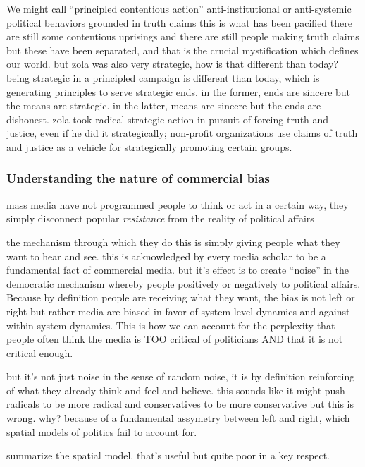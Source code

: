 \documentclass[12pt,book]{article}
\begin{document}
We might call ``principled contentious action'' anti-institutional or
anti-systemic political behaviors grounded in truth claims this is what
has been pacified there are still some contentious uprisings and there
are still people making truth claims but these have been separated, and
that is the crucial mystification which defines our world. but zola was
also very strategic, how is that different than today? being strategic
in a principled campaign is different than today, which is generating
principles to serve strategic ends. in the former, ends are sincere but
the means are strategic. in the latter, means are sincere but the ends
are dishonest. zola took radical strategic action in pursuit of forcing
truth and justice, even if he did it strategically; non-profit
organizations use claims of truth and justice as a vehicle for
strategically promoting certain groups.

\subsubsection{Understanding the nature of commercial
bias}\label{understanding-the-nature-of-commercial-bias}

mass media have not programmed people to think or act in a certain way,
they simply disconnect popular \emph{resistance} from the reality of
political affairs

the mechanism through which they do this is simply giving people what
they want to hear and see. this is acknowledged by every media scholar
to be a fundamental fact of commercial media. but it's effect is to
create ``noise'' in the democratic mechanism whereby people positively
or negatively to political affairs. Because by definition people are
receiving what they want, the bias is not left or right but rather media
are biased in favor of system-level dynamics and against within-system
dynamics. This is how we can account for the perplexity that people
often think the media is TOO critical of politicians AND that it is not
critical enough.

but it's not just noise in the sense of random noise, it is by
definition reinforcing of what they already think and feel and believe.
this sounds like it might push radicals to be more radical and
conservatives to be more conservative but this is wrong. why? because of
a fundamental assymetry between left and right, which spatial models of
politics fail to account for.

summarize the spatial model. that's useful but quite poor in a key
respect.
\end{document}
